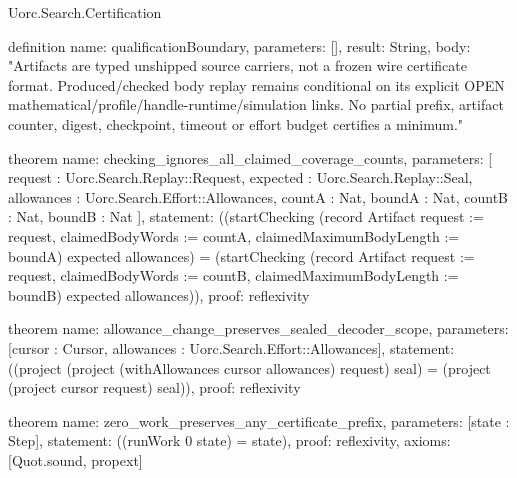 \begin{lexlean}{Uorc.Search.Certification}
\begin{semanticmodule}
definition{
  name: qualificationBoundary,
  parameters: [],
  result: String,
  body: "Artifacts are typed unshipped source carriers, not a frozen wire certificate format. Produced/checked body replay remains conditional on its explicit OPEN mathematical/profile/handle-runtime/simulation links. No partial prefix, artifact counter, digest, checkpoint, timeout or effort budget certifies a minimum."
}

theorem{
  name: checking_ignores_all_claimed_coverage_counts,
  parameters: [
    request : Uorc.Search.Replay::Request,
    expected : Uorc.Search.Replay::Seal,
    allowances : Uorc.Search.Effort::Allowances,
    countA : Nat,
    boundA : Nat,
    countB : Nat,
    boundB : Nat
  ],
  statement: ((startChecking (record Artifact {request := request, claimedBodyWords := countA, claimedMaximumBodyLength := boundA}) expected allowances) = (startChecking (record Artifact {request := request, claimedBodyWords := countB, claimedMaximumBodyLength := boundB}) expected allowances)),
  proof: reflexivity{}
}

theorem{
  name: allowance_change_preserves_sealed_decoder_scope,
  parameters: [cursor : Cursor, allowances : Uorc.Search.Effort::Allowances],
  statement: ((project (project (withAllowances cursor allowances) request) seal) = (project (project cursor request) seal)),
  proof: reflexivity{}
}

theorem{
  name: zero_work_preserves_any_certificate_prefix,
  parameters: [state : Step],
  statement: ((runWork 0 state) = state),
  proof: reflexivity{},
  axioms: [Quot.sound, propext]
}
\end{semanticmodule}
\end{lexlean}
